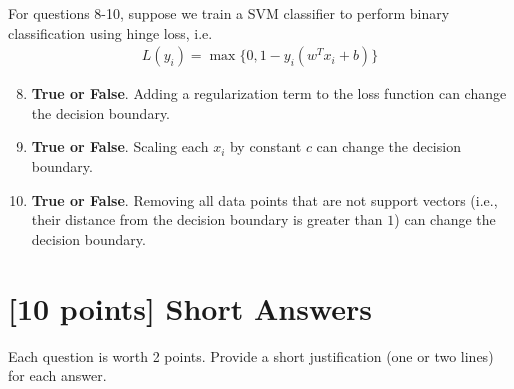\documentclass{article}
\newif\ifsolutions
\newenvironment{labelledanswer}{{\bf Answer:} \sf }{}%
\newcommand{\answer}[2]
{{
\ifsolutions
\begin{labelledanswer}
\color{red} 
#2
\end{labelledanswer}
\else
#1
\fi
}}
\begin{document}
\noindent For questions 8-10, suppose we train a SVM classifier to perform binary classification using hinge loss, i.e. 
\begin{align}
    L(y_i) = \max\{0, 1 - y_i (w^T x_i + b)\} 
\end{align}

\begin{enumerate}

\setcounter{enumi}{7}

\item \textbf{True or False}. Adding a regularization term to the loss function can change the decision boundary.

\answer{}{True, just like in class discussion on regularization and the non-separable case, this technique is used to make decision boundary less sensitive to outliers.}

\item \textbf{True or False}. Scaling each $x_i$ by constant $c$ can change the decision boundary.

\answer{}{False, since scaling all training data point by a constant c means that the distance from the points to decision boundary remains the same. SVM will again give us the same decision boundary.}

\item \textbf{True or False}. Removing all data points that are not support vectors (i.e., their distance from the decision boundary is greater than $1$) can change the decision boundary.

\answer{}{If done before introducing a new training, then True, because SVM would try to recreate the decision boundary using only the leftover points. However, if we mean that after we train, we only save the support vectors, and try to make prediction on a new point, then False, decision boundary remains the same.}

\end{enumerate}

\clearpage

\section{[10 points] Short Answers}

Each question is worth 2 points. Provide a short justification (one or two lines) for each answer.
\end{document}
